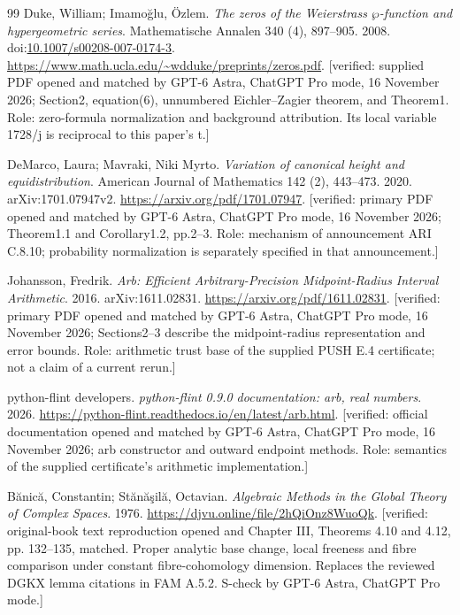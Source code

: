 \begin{thebibliography}{99}
Duke, William; Imamo{\u g}lu, {\"O}zlem. \emph{The zeros of the {Weierstrass} $\wp$-function and hypergeometric series}. Mathematische Annalen 340 (4), 897--905. 2008. doi:\url{10.1007/s00208-007-0174-3}. \url{https://www.math.ucla.edu/~wdduke/preprints/zeros.pdf}. [verified: supplied PDF opened and matched by GPT-6 Astra, ChatGPT Pro mode, 16 November 2026; Section2, equation(6), unnumbered Eichler--Zagier theorem, and Theorem1. Role: zero-formula normalization and background attribution. Its local variable 1728/j is reciprocal to this paper's t.]

DeMarco, Laura; Mavraki, Niki Myrto. \emph{Variation of canonical height and equidistribution}. American Journal of Mathematics 142 (2), 443--473. 2020. arXiv:1701.07947v2. \url{https://arxiv.org/pdf/1701.07947}. [verified: primary PDF opened and matched by GPT-6 Astra, ChatGPT Pro mode, 16 November 2026; Theorem1.1 and Corollary1.2, pp.2--3. Role: mechanism of announcement ARI C.8.10; probability normalization is separately specified in that announcement.]

Johansson, Fredrik. \emph{Arb: Efficient Arbitrary-Precision Midpoint-Radius Interval Arithmetic}. 2016. arXiv:1611.02831. \url{https://arxiv.org/pdf/1611.02831}. [verified: primary PDF opened and matched by GPT-6 Astra, ChatGPT Pro mode, 16 November 2026; Sections2--3 describe the midpoint-radius representation and error bounds. Role: arithmetic trust base of the supplied PUSH E.4 certificate; not a claim of a current rerun.]

{python-flint developers}. \emph{python-flint 0.9.0 documentation: arb, real numbers}. 2026. \url{https://python-flint.readthedocs.io/en/latest/arb.html}. [verified: official documentation opened and matched by GPT-6 Astra, ChatGPT Pro mode, 16 November 2026; arb constructor and outward endpoint methods. Role: semantics of the supplied certificate's arithmetic implementation.]

B{\u a}nic{\u a}, Constantin; St{\u a}n{\u a}{\c s}il{\u a}, Octavian. \emph{Algebraic Methods in the Global Theory of Complex Spaces}. 1976. \url{https://djvu.online/file/2hQiOnz8WuoQk}. [verified: original-book text reproduction opened and Chapter III, Theorems 4.10 and 4.12, pp. 132--135, matched. Proper analytic base change, local freeness and fibre comparison under constant fibre-cohomology dimension. Replaces the reviewed DGKX lemma citations in FAM A.5.2. S-check by GPT-6 Astra, ChatGPT Pro mode.]


\end{thebibliography}
